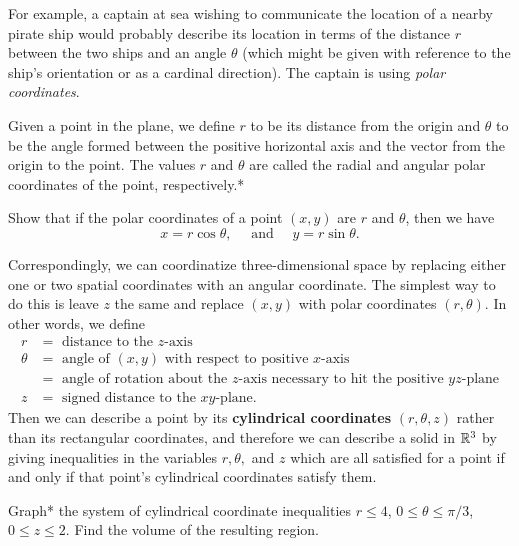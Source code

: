 \documentclass{watsonbook}
\begin{document}
For example, a captain at sea wishing to communicate the location of a
nearby pirate ship would probably describe its location in terms of
the distance $r$ between the two ships and an angle $\theta$ (which
might be given with reference to the ship's orientation or as a
cardinal direction). The captain is using \textit{polar coordinates}. 

Given a point in the plane, we define $r$ to be its distance from the
origin and $\theta$ to be the angle formed between the positive
horizontal axis and the vector from the
origin to the point. The values $r$ and $\theta$ are called the radial
and angular 
polar coordinates of the point, respectively.* 

\begin{exercise}{}{}
  Show that if the polar coordinates of a point $(x,y)$ are $r$ and
  $\theta$, then we have
  \[
    x = r\cos \theta, \quad \text { and } \quad y  = r\sin \theta. 
  \]
\end{exercise}

Correspondingly, we can coordinatize three-dimensional space by
replacing either one or two spatial coordinates with an angular
coordinate. The simplest way to do this is leave $z$ the same and
replace $(x,y)$ with polar coordinates $(r,\theta)$. In other words,
we define
\begin{align*}
  r &= \text{ distance to the }z\text{-axis} \\
  \theta &= \text{ angle of } (x,y) \text{ with respect to positive
           }x\text{-axis} \\  &=
                                \text{ angle of rotation
                                about the }z\text{-axis necessary to hit the
                                positive }yz\text{-plane}  \\ 
  z &= \text{ signed distance to the }xy\text{-plane}. 
\end{align*}
Then we can describe a point by its \textbf{cylindrical coordinates}
$(r,\theta, z)$ rather than its rectangular coordinates, and therefore
we can describe a solid in $\mathbb{R}^3$ by giving inequalities in the
variables $r, \theta,$ and $z$ which are all satisfied for a point if
and only if that point's cylindrical coordinates satisfy
them. 

\begin{example}{}{}
  Graph* the system of cylindrical coordinate inequalities $r \leq 4$,
  $0 \leq \theta \leq \pi/3$, $0 \leq z \leq 2$. Find the volume of
  the resulting region. 
\end{example}
\end{document}
